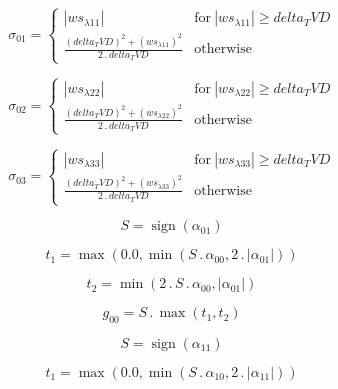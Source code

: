 \documentclass{article}
\begin{document}
\begin{dmath}\sigma_{0 1} = \begin{cases} \left|{ws_{\lambda 11}}\right| & \text{for}\: \left|{ws_{\lambda 11}}\right| \geq delta_TVD \\\frac{\left(delta_TVD \right)^{2} + \left(ws_{\lambda 11} \right)^{2}}{2 \,.\, delta_TVD} & \text{otherwise} 
\end{cases}\end{dmath}

\begin{dmath}\sigma_{0 2} = \begin{cases} \left|{ws_{\lambda 22}}\right| & \text{for}\: \left|{ws_{\lambda 22}}\right| \geq delta_TVD \\\frac{\left(delta_TVD \right)^{2} + \left(ws_{\lambda 22} \right)^{2}}{2 \,.\, delta_TVD} & \text{otherwise} 
\end{cases}\end{dmath}

\begin{dmath}\sigma_{0 3} = \begin{cases} \left|{ws_{\lambda 33}}\right| & \text{for}\: \left|{ws_{\lambda 33}}\right| \geq delta_TVD \\\frac{\left(delta_TVD \right)^{2} + \left(ws_{\lambda 33} \right)^{2}}{2 \,.\, delta_TVD} & \text{otherwise} 
\end{cases}\end{dmath}

\begin{dmath}S = \operatorname{sign}{\left (\alpha_{01} \right )}\end{dmath}

\begin{dmath}t_{1} = \max\left(0.0, \min\left(S \,.\, \alpha_{00}, 2 \,.\, \left|{\alpha_{01}}\right|\right)\right)\end{dmath}

\begin{dmath}t_{2} = \min\left(2 \,.\, S \,.\, \alpha_{00}, \left|{\alpha_{01}}\right|\right)\end{dmath}

\begin{dmath}g_{00} = S \,.\, \max\left(t_{1}, t_{2}\right)\end{dmath}

\begin{dmath}S = \operatorname{sign}{\left (\alpha_{11} \right )}\end{dmath}

\begin{dmath}t_{1} = \max\left(0.0, \min\left(S \,.\, \alpha_{10}, 2 \,.\, \left|{\alpha_{11}}\right|\right)\right)\end{dmath}
\end{document}
